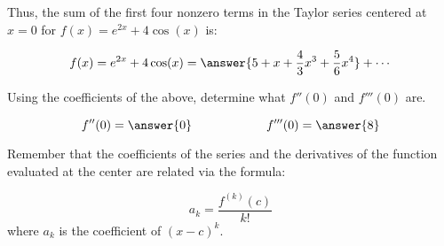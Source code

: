 \documentclass{ximera}
\begin{document}
\begin{exercise}
\begin{exercise}
Thus, the sum of the first four nonzero terms in the Taylor series centered at $x=0$ for  $f(x) = e^{2x} + 4\cos(x)$ is:

\[
f(x) = e^{2x} + 4\cos(x) = \answer{5+x+\frac{4}{3}x^3+\frac{5}{6}x^4} + \cdots 
\]

\begin{exercise}
Using the coefficients of the above, determine what $f''(0)$ and $f'''(0)$ are.

\[
f''(0) = \answer{0} \qquad \qquad \qquad f'''(0) = \answer{8}
\]

\begin{hint}
Remember that the coefficients of the series and the derivatives of the function evaluated at the center are related via the formula:

\[
a_k = \frac{f^{(k)}(c)}{k!}
\]
where $a_k$ is the coefficient of $(x-c)^k$.
\end{hint}

\end{exercise}
\end{exercise}
\end{exercise}
\end{document}

